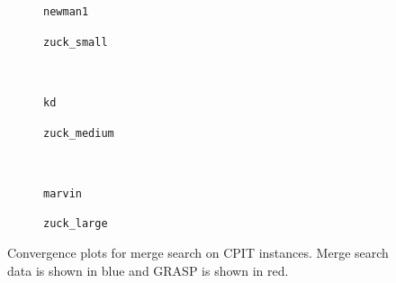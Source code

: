 \documentclass[authoryear,11pt,square,number,times,super,comma]{elsarticle}
\newcommand{\newman}{\texttt{newman1}}
\newcommand{\zucksmall}{\texttt{zuck\_small}}
\newcommand{\zuckmed}{\texttt{zuck\_medium}}
\newcommand{\zucklarge}{\texttt{zuck\_large}}
\newcommand{\marvin}{\texttt{marvin}}
\newcommand{\dmine}{\texttt{kd}}
\begin{document}
\begin{figure}[!]
    \centering
    \begin{subfigure}[t]{0.4\textwidth}
    \centering
    \vspace*{-5mm}\caption{\newman{}}
    \label{plot:newman-conv}
    \end{subfigure}
    \quad
    \begin{subfigure}[t]{0.4\textwidth}
    \centering
    \vspace*{-5mm}\caption{\zucksmall{}}
    \label{plot:zuck-small-conv}
    \end{subfigure}
    \\[5mm]
    \centering
    \begin{subfigure}[t]{0.4\textwidth}
    \centering
    \vspace*{-5mm}\caption{\dmine{}}
    \label{plot:kd-conv}
    \end{subfigure}
    \quad
    \begin{subfigure}[t]{0.4\textwidth}
    \centering
    \vspace*{-5mm}\caption{\zuckmed{}}
    \label{plot:zuck-med-conv}
    \end{subfigure}
    \\[5mm]
    \centering
    \begin{subfigure}[t]{0.4\textwidth}
    \centering
    \vspace*{-5mm}\caption{\marvin{}}
    \label{plot:marvin-conv}
    \end{subfigure}
    \quad
    \begin{subfigure}[t]{0.4\textwidth}
    \centering
    \vspace*{-5mm}\caption{\zucklarge{}}
    \label{plot:zuck-large-conv}
    \end{subfigure}
    \caption[Convergence plots for merge search on CPIT instances]{Convergence plots for merge search on CPIT instances. Merge search data is shown in blue and GRASP is shown in red.}
    \label{plot:mine:runtime}
\end{figure}
\end{document}
